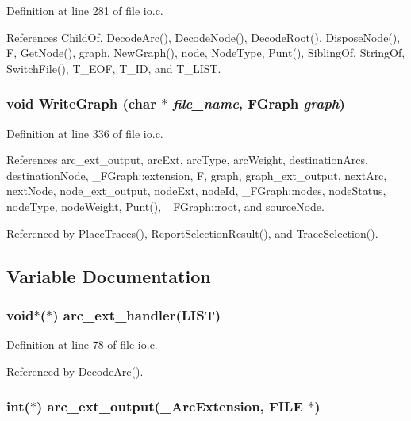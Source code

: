 Definition at line 281 of file io.c.

References Child\-Of, Decode\-Arc(), Decode\-Node(), Decode\-Root(), Dispose\-Node(), F, Get\-Node(), graph, New\-Graph(), node, Node\-Type, Punt(), Sibling\-Of, String\-Of, Switch\-File(), T\_\-EOF, T\_\-ID, and T\_\-LIST.
\subsubsection{\setlength{\rightskip}{0pt plus 5cm}void Write\-Graph (char $\ast$ {\em file\_\-name}, \bf{FGraph} {\em graph})}\label{io_8h_43332ea2deb3de2c14269ac1f8703b54}




Definition at line 336 of file io.c.

References arc\_\-ext\_\-output, arc\-Ext, arc\-Type, arc\-Weight, destination\-Arcs, destination\-Node, \_\-FGraph::extension, F, graph, graph\_\-ext\_\-output, next\-Arc, next\-Node, node\_\-ext\_\-output, node\-Ext, node\-Id, \_\-FGraph::nodes, node\-Status, node\-Type, node\-Weight, Punt(), \_\-FGraph::root, and source\-Node.

Referenced by Place\-Traces(), Report\-Selection\-Result(), and Trace\-Selection().

\subsection{Variable Documentation}
\subsubsection{\setlength{\rightskip}{0pt plus 5cm}void$\ast$($\ast$) \bf{arc\_\-ext\_\-handler}(\bf{LIST})}\label{io_8h_b36497c05c53cdeef150bffb4c704344}




Definition at line 78 of file io.c.

Referenced by Decode\-Arc().
\subsubsection{\setlength{\rightskip}{0pt plus 5cm}int($\ast$) \bf{arc\_\-ext\_\-output}(\bf{\_\-Arc\-Extension}, FILE $\ast$)}\label{io_8h_4f39c61f89b8bbd9b61791d39fdc9a0b}




